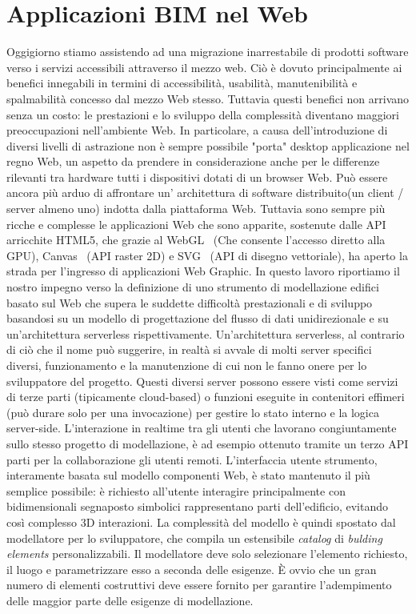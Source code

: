 \section{Applicazioni BIM nel Web}
\label{sec:chapter_1_section_3}

Oggigiorno stiamo assistendo ad una migrazione inarrestabile di prodotti software verso i servizi accessibili
attraverso il mezzo web. Ciò è dovuto principalmente ai benefici innegabili in termini di accessibilità, usabilità,
manutenibilità e spalmabilità concesso dal mezzo Web stesso.
Tuttavia questi benefici non arrivano senza un costo: le prestazioni e lo sviluppo della complessità diventano
maggiori preoccupazioni nell'ambiente Web.
In particolare, a causa dell'introduzione di diversi livelli di astrazione non è sempre possibile "porta" desktop
applicazione nel regno Web, un aspetto da prendere in considerazione anche per le differenze rilevanti tra hardware
tutti i dispositivi dotati di un browser Web.
Può essere ancora più arduo di affrontare un' architettura di software distribuito(un client / server almeno uno)
indotta dalla piattaforma Web. Tuttavia sono sempre più ricche e complesse le applicazioni Web che sono apparite,
sostenute dalle API arricchite HTML5, che grazie al WebGL~\cite{webgl}
(Che consente l'accesso diretto alla GPU), Canvas~\cite{Munro:15:HCC} (API raster 2D) e SVG~\cite{Jackson:11:SVG}
(API di disegno vettoriale), ha aperto la strada per l'ingresso di applicazioni Web Graphic.
In questo lavoro riportiamo il nostro impegno verso la definizione di uno strumento di modellazione edifici basato sul Web
che supera le suddette difficoltà prestazionali e di sviluppo basandosi su un modello di progettazione del flusso di dati
unidirezionale e su un'architettura serverless rispettivamente.
Un'architettura serverless, al contrario di ciò che il nome può suggerire, in realtà si avvale di molti server specifici
diversi, funzionamento e la manutenzione di cui non le fanno onere per lo sviluppatore del progetto.
Questi diversi server possono essere visti come servizi di terze parti (tipicamente cloud-based) o funzioni eseguite
in contenitori effimeri (può durare solo per una invocazione) per gestire lo stato interno e la logica server-side.
L'interazione in realtime tra gli utenti che lavorano congiuntamente sullo stesso progetto di modellazione,
è ad esempio ottenuto tramite un terzo API parti per la collaborazione gli utenti remoti.
L'interfaccia utente strumento, interamente basata sul modello componenti Web, è stato mantenuto il più semplice possibile: è richiesto all'utente
 interagire principalmente con bidimensionali segnaposto simbolici rappresentano parti dell'edificio, evitando così complesso 3D
  interazioni.
La complessità del modello è quindi spostato dal modellatore per lo sviluppatore, che compila un estensibile \emph{catalog} di
\emph{bulding elements} personalizzabili. Il modellatore deve solo selezionare l'elemento richiesto, il luogo e parametrizzare
esso a seconda delle esigenze. È ovvio che un gran numero di elementi costruttivi deve essere fornito per garantire
l'adempimento delle maggior parte delle esigenze di modellazione.

